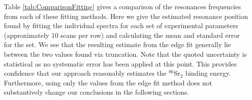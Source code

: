 Table \ref{tab:ComparisonFitting} gives a comparison of the resonances frequencies from each of these fitting methods.
Here we give the estimated resonance position found by fitting the individual spectra for each set of experimental parameters (approximately 10 scans per row) and calculating the mean and standard error for the set.
We see that the resulting estimate from the edge fit generally lie between the two values found via truncation.
Note that the quoted uncertainty is statistical as no systematic error has been applied at this point.
This provides confidence that our approach reasonably estimates the $^{86}$Sr$_2$ binding energy.
Furthermore, using only the values from the edge fit method does not substantively change our conclusions in the following sections.
	\begin{table}[]
		\centering
\end{table}
